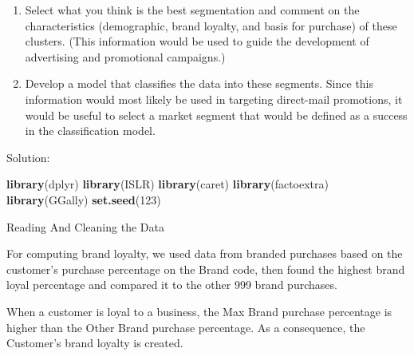 \documentclass[
]{article}
\newenvironment{Shaded}{\begin{snugshade}}{\end{snugshade}}
\newcommand{\ControlFlowTok}[1]{\textcolor[rgb]{0.13,0.29,0.53}{\textbf{#1}}}
\newcommand{\DecValTok}[1]{\textcolor[rgb]{0.00,0.00,0.81}{#1}}
\newcommand{\KeywordTok}[1]{\textcolor[rgb]{0.13,0.29,0.53}{\textbf{#1}}}
\newcommand{\NormalTok}[1]{#1}
\newcommand{\StringTok}[1]{\textcolor[rgb]{0.31,0.60,0.02}{#1}}
\begin{document}
\begin{enumerate}
\def\labelenumi{\arabic{enumi}.}
\setcounter{enumi}{1}
\item
  Select what you think is the best segmentation and comment on the
  characteristics (demographic, brand loyalty, and basis for purchase)
  of these clusters. (This information would be used to guide the
  development of advertising and promotional campaigns.)
\item
  Develop a model that classifies the data into these segments. Since
  this information would most likely be used in targeting direct-mail
  promotions, it would be useful to select a market segment that would
  be defined as a success in the classification model.
\end{enumerate}

Solution:

\begin{Shaded}
\begin{Highlighting}[]
\KeywordTok{library}\NormalTok{(dplyr)}
\KeywordTok{library}\NormalTok{(ISLR)}
\KeywordTok{library}\NormalTok{(caret)}
\KeywordTok{library}\NormalTok{(factoextra)}
\KeywordTok{library}\NormalTok{(GGally)}
\KeywordTok{set.seed}\NormalTok{(}\DecValTok{123}\NormalTok{)}
\end{Highlighting}
\end{Shaded}

Reading And Cleaning the Data

\begin{Shaded}
\end{Shaded}

For computing brand loyalty, we used data from branded purchases based
on the customer's purchase percentage on the Brand code, then found the
highest brand loyal percentage and compared it to the other 999 brand
purchases.

When a customer is loyal to a business, the Max Brand purchase
percentage is higher than the Other Brand purchase percentage. As a
consequence, the Customer's brand loyalty is created.
\end{document}
